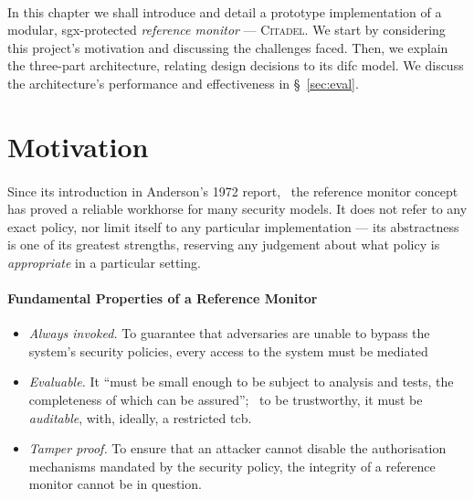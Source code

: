 

\paragraph{} In this chapter we shall introduce and detail a prototype implementation of a modular, \acrshort{sgx}-protected \textit{reference monitor} --- \textsc{Citadel}. We start by considering this project's motivation and discussing the challenges faced. Then, we explain the three-part architecture, relating design decisions to its \acrshort{difc} model. We discuss the architecture's performance and effectiveness in §~\ref{sec:eval}.

\section{Motivation}
\paragraph{} Since its introduction in Anderson's 1972 report,~\cite{reference-monitor} the reference monitor concept has proved a reliable workhorse for many security models. It does not refer to any exact policy, nor limit itself to any particular implementation --- its abstractness is one of its greatest strengths, reserving any judgement about what policy is \textit{appropriate} in a particular setting.~\cite{irvine-rm}

\paragraph{Fundamental Properties of a Reference Monitor}

\begin{itemize}
    \item \textit{Always invoked.} To guarantee that adversaries are unable to bypass the system's security policies, every access to the system must be mediated
    \item \textit{Evaluable.} It ``must be small enough to be subject to analysis and tests, the completeness of which can be assured'';~\cite{reference-monitor} to be trustworthy, it must be \textit{auditable}, with, ideally, a restricted \acrshort{tcb}.
    \item \textit{Tamper proof.} To ensure that an attacker cannot disable the authorisation mechanisms mandated by the security policy, the integrity of a reference monitor cannot be in question.
\end{itemize}

